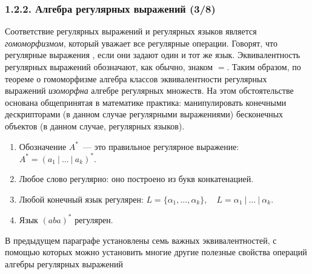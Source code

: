 \begin{frame}
\frametitle{1.2.2. Алгебра регулярных выражений (3/8)}
Соответствие регулярных выражений и регулярных языков является 
{\em гомоморфизмом}, который уважает все регулярные операции.
Говорят, что регулярные выражения
, если они задают
один и тот же язык. 
Эквивалентность регулярных 
выражений обозначают, как обычно, знаком $=$.
Таким образом, по теореме о гомоморфизме алгебра классов эквивалентности
регулярных выражений {\em изоморфна} алгебре регулярных множеств.
На этом обстоятельстве основана общепринятая в математике практика:
манипулировать конечными дескрипторами (в данном случае регулярными выражениями)
бесконечных объектов (в данном случае, регулярных языков).

\begin{examples}
\begin{enumerate}
  \item Обозначение $A^*$~--- это правильное регулярное выражение:
  $
A^*=(a_1~|~\dots~|~ a_k)^*.
$
  \item Любое слово регулярно: оно построено из букв
  конкатенацией.
  \item Любой конечный язык регулярен:
$
L=\{\alpha_1,\dots, \alpha_k\},\quad
  L=\alpha_1~|~\dots~|~\alpha_k.
$
  \item  Язык $(aba)^*$  регулярен.
\end{enumerate}
\end{examples}



В предыдущем параграфе
установлены семь важных эквивалентностей,
с помощью которых можно установить многие другие
полезные свойства операций алгебры регулярных
выражений  


\end{frame}

